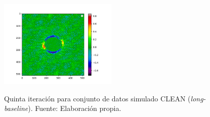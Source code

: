 \begin{figure}[!ht]
{   \label{fig:clean_residual_color_5iter}
    \includegraphics[width=0.5\textwidth]{images/sim_p4_long_color_residual.png}}
 \caption[Quinta iteración para conjunto de datos simulado CLEAN (\textit{long-baseline})]{Quinta iteración para conjunto de datos simulado CLEAN (\textit{long-baseline}). Fuente: Elaboración propia.}
 \label{fig:phasecal_5iter}
\end{figure}

